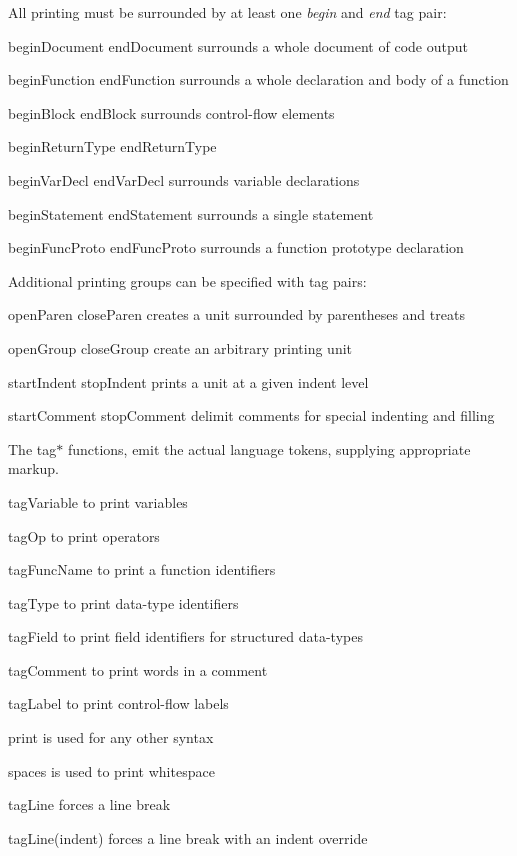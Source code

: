 All printing must be surrounded by at least one {\itshape begin} and {\itshape end} tag pair\+:
\begin{DoxyItemize}
\item begin\+Document end\+Document surrounds a whole document of code output
\item begin\+Function end\+Function surrounds a whole declaration and body of a function
\item begin\+Block end\+Block surrounds control-\/flow elements
\item begin\+Return\+Type end\+Return\+Type
\item begin\+Var\+Decl end\+Var\+Decl surrounds variable declarations
\item begin\+Statement end\+Statement surrounds a single statement
\item begin\+Func\+Proto end\+Func\+Proto surrounds a function prototype declaration
\end{DoxyItemize}

Additional printing groups can be specified with tag pairs\+:
\begin{DoxyItemize}
\item open\+Paren close\+Paren creates a unit surrounded by parentheses and treats
\item open\+Group close\+Group create an arbitrary printing unit
\item start\+Indent stop\+Indent prints a unit at a given indent level
\item start\+Comment stop\+Comment delimit comments for special indenting and filling
\end{DoxyItemize}

The tag$\ast$ functions, emit the actual language tokens, supplying appropriate markup.
\begin{DoxyItemize}
\item tag\+Variable to print variables
\item tag\+Op to print operators
\item tag\+Func\+Name to print a function identifiers
\item tag\+Type to print data-\/type identifiers
\item tag\+Field to print field identifiers for structured data-\/types
\item tag\+Comment to print words in a comment
\item tag\+Label to print control-\/flow labels
\item print is used for any other syntax
\item spaces is used to print whitespace
\item tag\+Line forces a line break
\item tag\+Line(indent) forces a line break with an indent override
\end{DoxyItemize}

